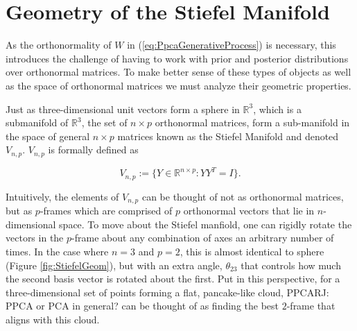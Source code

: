 \documentclass{article}
\newcommand{\commentRJ}[1]{{\textcolor{commentRJ_color}{RJ: #1}}}
\begin{document}
\section{Geometry of the Stiefel Manifold} \label{geometry}

As the orthonormality of $W$ in (\ref{eq:PpcaGenerativeProcess}) is necessary, this introduces the challenge of having to work with prior and posterior distributions over orthonormal matrices. To make better sense of these types of objects as well as the space of orthonormal matrices we must analyze their geometric properties.

Just as three-dimensional unit vectors form a sphere in $\mathbb{R}^3$, which is a submanifold of $\mathbb{R}^3$, the set of $n\times p$ orthonormal matrices, form a sub-manifold in the space of general $n \times p$ matrices known as the Stiefel Manifold and denoted $V_{n,p}$\citep{muirhead2009aspects}. $V_{n,p}$ is formally defined as

\begin{equation}
V_{n,p} := \{Y \in \mathbb{R}^{n \times p}: YY^T = I \}.
\end{equation}

Intuitively, the elements of $V_{n,p}$ can be thought of not as orthonormal matrices, but as $p$-frames which are comprised of $p$ orthonormal vectors that lie in $n$-dimensional space. To move about the Stiefel manfiold, one can rigidly rotate the vectors in the $p$-frame about any combination of axes an arbitrary number of times. In the case where $n = 3$ and $p = 2$, this is almost identical to sphere (Figure \ref{fig:StiefelGeom}), but with an extra angle, $\theta_{23}$ that controls how much the second basis vector is rotated about the first. Put in this perspective, for a three-dimensional set of points forming a flat, pancake-like cloud, PPCA\commentRJ{PPCA or PCA in general?} can be thought of as finding the best $2$-frame that aligns with this cloud.
\end{document}
